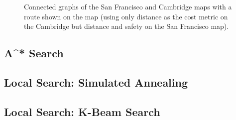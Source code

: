 \documentclass[11pt]{article}
\begin{document}
\begin{figure}%
    \centering
    \qquad
    \caption{Connected graphs of the San Francisco and Cambridge maps with a route shown on the map (using only distance as the cost metric on the Cambridge but distance and safety on the San Francisco map).}
    \label{connected_graphs}%
\end{figure}

\subsection{A^{*} Search}

\subsection{Local Search: Simulated Annealing}

\subsection{Local Search: K-Beam Search}
\end{document}

